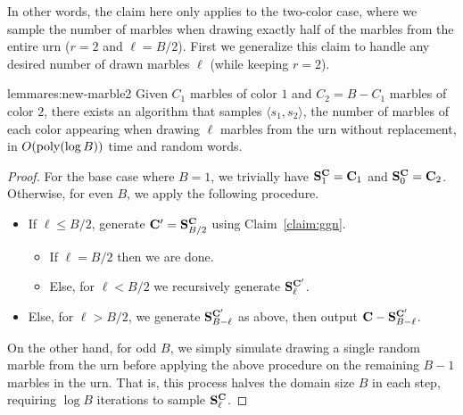 In other words, the claim here only applies to the two-color case,
where we sample the number of marbles when drawing exactly half of the marbles from the entire urn ($r=2$ and $\ell = B/2$).
First we generalize this claim to handle any desired number of drawn marbles $\ell$ (while keeping $r=2$).

\begin{restatable}{lemma}{res:new-marble2}\label{thm:sampling_two_colors}
Given $C_1$ marbles of color $1$ and $C_2 = B-C_1$ marbles of color $2$,
there exists an algorithm that samples $\langle s_1, s_2 \rangle$,
the number of marbles of each color appearing when drawing $\ell$ marbles from the urn without replacement,
in $O(\mathrm{poly}(\log B))$ time and random words.
\end{restatable}
\begin{proof}
For the base case where $B=1$, we trivially have $\mathbf{S}^{\mathbf{C}}_1=\mathbf{C}_1$ and $\mathbf{S}^{\mathbf{C}}_0=\mathbf{C}_2$.
Otherwise, for even $B$, we apply the following procedure.
\begin{itemize}
\item If $\ell \leq B/2$, generate $\mathbf{C}'=\mathbf{S}^{\mathbf{C}}_{B/2}$ using Claim~\ref{claim:ggn}.
\begin{itemize}
\item If $\ell = B/2$ then we are done.
\item Else, for $\ell < B/2$ we recursively generate $\mathbf{S}^{\mathbf{C'}}_{\ell}$.
\end{itemize}
\item Else, for $\ell > B/2$, we generate $\mathbf{S}^{\mathbf{C'}}_{B-\ell}$ as above, then output $\mathbf{C}-\mathbf{S}^{\mathbf{C'}}_{B-\ell}$.
\end{itemize}
On the other hand, for odd $B$, we simply simulate drawing a single random marble
from the urn before applying the above procedure on the remaining $B-1$ marbles in the urn.
That is, this process halves the domain size $B$ in each step, requiring $\log B$ iterations to sample $\mathbf{S}^{\mathbf{C}}_\ell$.
\end{proof}

